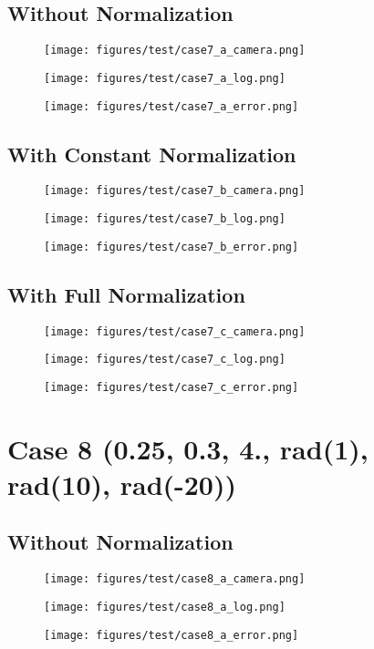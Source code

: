 \subsection{Without Normalization}
\begin{figure}[ht!] \centering \texttt{[image: figures/test/case7\_a\_camera.png]} \end{figure}
\begin{figure}[ht!] \centering \texttt{[image: figures/test/case7\_a\_log.png]} \end{figure}
\begin{figure}[ht!] \centering \texttt{[image: figures/test/case7\_a\_error.png]} \end{figure}
\clearpage
\subsection{With Constant Normalization}
\begin{figure}[ht!] \centering \texttt{[image: figures/test/case7\_b\_camera.png]} \end{figure}
\begin{figure}[ht!] \centering \texttt{[image: figures/test/case7\_b\_log.png]} \end{figure}
\begin{figure}[ht!] \centering \texttt{[image: figures/test/case7\_b\_error.png]} \end{figure}
\clearpage
\subsection{With Full Normalization}
\begin{figure}[ht!] \centering \texttt{[image: figures/test/case7\_c\_camera.png]} \end{figure}
\begin{figure}[ht!] \centering \texttt{[image: figures/test/case7\_c\_log.png]} \end{figure}
\begin{figure}[ht!] \centering \texttt{[image: figures/test/case7\_c\_error.png]} \end{figure}
\clearpage

\section{Case 8 (0.25, 0.3, 4., rad(1), rad(10), rad(-20))}
\subsection{Without Normalization}
\begin{figure}[ht!] \centering \texttt{[image: figures/test/case8\_a\_camera.png]} \end{figure}
\begin{figure}[ht!] \centering \texttt{[image: figures/test/case8\_a\_log.png]} \end{figure}
\begin{figure}[ht!] \centering \texttt{[image: figures/test/case8\_a\_error.png]} \end{figure}
\clearpage
